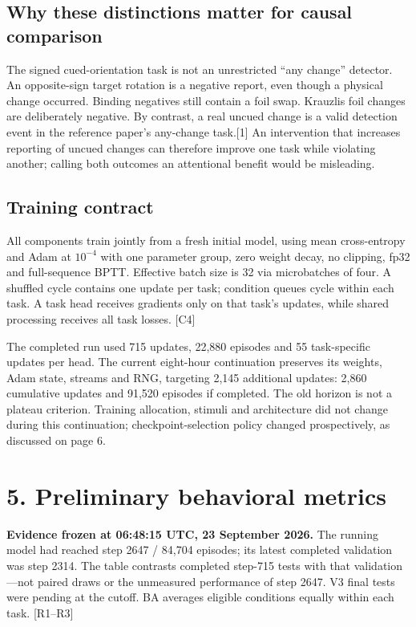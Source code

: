 \documentclass[
  10pt,
]{article}
\begin{document}
\subsection{Why these distinctions matter for causal
comparison}\label{why-these-distinctions-matter-for-causal-comparison}

The signed cued-orientation task is not an unrestricted ``any change''
detector. An opposite-sign target rotation is a negative report, even
though a physical change occurred. Binding negatives still contain a
foil swap. Krauzlis foil changes are deliberately negative. By contrast,
a real uncued change is a valid detection event in the reference paper's
any-change task.{[}1{]} An intervention that increases reporting of
uncued changes can therefore improve one task while violating another;
calling both outcomes an attentional benefit would be misleading.

\subsection{Training contract}\label{training-contract}

All components train jointly from a fresh initial model, using mean
cross-entropy and Adam at \(10^{-4}\) with one parameter group, zero
weight decay, no clipping, fp32 and full-sequence BPTT. Effective batch
size is 32 via microbatches of four. A shuffled cycle contains one
update per task; condition queues cycle within each task. A task head
receives gradients only on that task's updates, while shared processing
receives all task losses. {[}C4{]}

The completed run used 715 updates, 22,880 episodes and 55 task-specific
updates per head. The current eight-hour continuation preserves its
weights, Adam state, streams and RNG, targeting 2,145 additional
updates: 2,860 cumulative updates and 91,520 episodes if completed. The
old horizon is not a plateau criterion. Training allocation, stimuli and
architecture did not change during this continuation;
checkpoint-selection policy changed prospectively, as discussed on page
6.

\newpage

\section{5. Preliminary behavioral
metrics}\label{preliminary-behavioral-metrics}

\textbf{Evidence frozen at 06:48:15 UTC, 23 September 2026.} The running
model had reached step 2647 / 84,704 episodes; its latest completed
validation was step 2314. The table contrasts completed step-715 tests
with that validation---not paired draws or the unmeasured performance of
step 2647. V3 final tests were pending at the cutoff. BA averages
eligible conditions equally within each task. {[}R1--R3{]}
\end{document}
